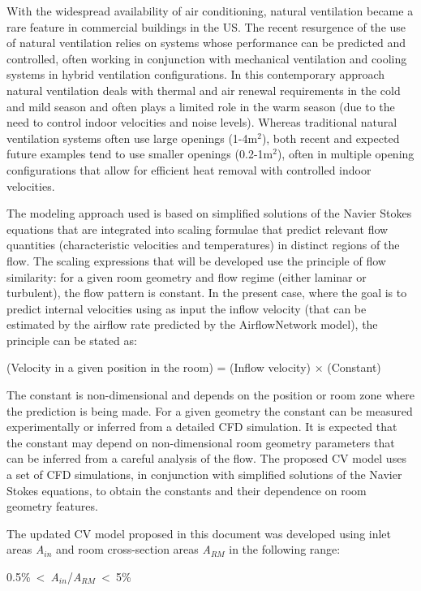 With the widespread availability of air conditioning, natural ventilation became a rare feature in commercial buildings in the US. The recent resurgence of the use of natural ventilation relies on systems whose performance can be predicted and controlled, often working in conjunction with mechanical ventilation and cooling systems in hybrid ventilation configurations. In this contemporary approach natural ventilation deals with thermal and air renewal requirements in the cold and mild season and often plays a limited role in the warm season (due to the need to control indoor velocities and noise levels). Whereas traditional natural ventilation systems often use large openings (1-4m\(^{2}\)), both recent and expected future examples tend to use smaller openings (0.2-1m\(^{2}\)), often in multiple opening configurations that allow for efficient heat removal with controlled indoor velocities.

The modeling approach used is based on simplified solutions of the Navier Stokes equations that are integrated into scaling formulae that predict relevant flow quantities (characteristic velocities and temperatures) in distinct regions of the flow. The scaling expressions that will be developed use the principle of flow similarity: for a given room geometry and flow regime (either laminar or turbulent), the flow pattern is constant. In the present case, where the goal is to predict internal velocities using as input the inflow velocity (that can be estimated by the airflow rate predicted by the AirflowNetwork model), the principle can be stated as:

(Velocity in a given position in the room) = (Inflow velocity) × (Constant)

The constant is non-dimensional and depends on the position or room zone where the prediction is being made. For a given geometry the constant can be measured experimentally or inferred from a detailed CFD simulation. It is expected that the constant may depend on non-dimensional room geometry parameters that can be inferred from a careful analysis of the flow. The proposed CV model uses a set of CFD simulations, in conjunction with simplified solutions of the Navier Stokes equations, to obtain the constants and their dependence on room geometry features.

The updated CV model proposed in this document was developed using inlet areas \emph{A}\(_{in}\) and room cross-section areas \emph{A}\(_{RM}\) in the following range:

0.5\%~\textless{}~\emph{A}\(_{in}\)/\emph{A}\(_{RM}\)~\textless{}~5\%

